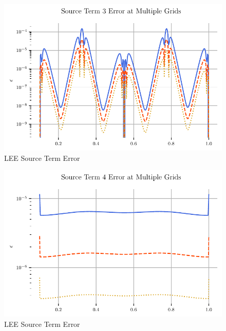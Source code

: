 \begin{figure}[h!]
    \centering
    \includegraphics{../../../CodeRun/04-plotReport/tex-outputs/MMS1_SourceTermError3.pdf}
    \caption{LEE Source Term Error}
    \label{fig:7}
\end{figure}


\begin{figure}[h!]
    \centering
    \includegraphics{../../../CodeRun/04-plotReport/tex-outputs/MMS1_SourceTermError4.pdf}
    \caption{LEE Source Term Error}
    \label{fig:7}
\end{figure}


